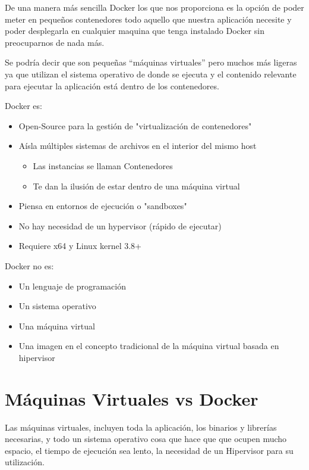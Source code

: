 De una manera más sencilla Docker los que nos proporciona es la opción de poder meter en pequeños contenedores todo aquello que nuestra aplicación necesite y poder desplegarla en cualquier maquina que tenga instalado Docker sin preocuparnos de nada más. 

Se podría decir que son pequeñas “máquinas virtuales” pero muchos más ligeras ya que utilizan el sistema operativo de donde se ejecuta y el contenido relevante para ejecutar la aplicación está dentro de los contenedores.
\newline 

Docker es:

\begin{itemize}
\item Open-Source para la gestión de "virtualización de contenedores"
\item Aísla múltiples sistemas de archivos en el interior del mismo host
\begin{itemize}
\item Las instancias se llaman Contenedores
\item Te dan la ilusión de estar dentro de una máquina virtual
\end{itemize}
\item Piensa en entornos de ejecución o "sandboxes"
\item No hay necesidad de un hypervisor (rápido de ejecutar)
\item Requiere x64 y Linux kernel 3.8+
\end{itemize}
\pagebreak 
Docker no es:

\begin{itemize}
\item Un lenguaje de programación
\item Un sistema operativo
\item Una máquina virtual
\item Una imagen en el concepto tradicional de la máquina virtual basada en hipervisor
\end{itemize}

\section{Máquinas Virtuales vs Docker}

Las máquinas virtuales, incluyen toda la aplicación, los binarios y librerías necesarias, y todo un sistema operativo cosa que hace que que ocupen mucho espacio, el tiempo de ejecución sea lento, la necesidad de un Hipervisor para su utilización.

